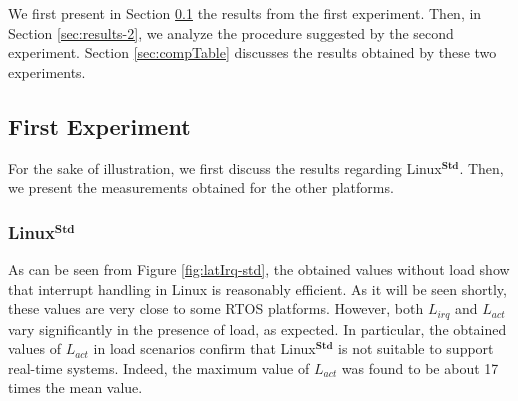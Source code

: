 \documentclass{acm_proc_article-sp}
\begin{document}
We first present in Section \ref{sec:results-1} the results from the first
experiment.  Then, in Section \ref{sec:results-2}, we analyze the procedure
suggested by the second experiment. Section \ref{sec:compTable} discusses the
results obtained by these two experiments.

\subsection{First Experiment}
\label{sec:results-1}

For the sake of illustration, we first discuss the results regarding
Linux$^\mathbf{Std}$.  Then, we present the measurements obtained for the other
platforms.

\subsubsection*{Linux$^\mathbf{Std}$}

As can be seen from Figure \ref{fig:latIrq-std}, the obtained values without load
show that interrupt handling in Linux is reasonably efficient. As it will be seen
shortly, these values are very close to some RTOS platforms.  However, both
$L_{irq}$ and $L_{act}$ vary significantly in the presence of load, as
expected.  In particular, the obtained values of $L_{act}$ in load scenarios
confirm that Linux$^\mathbf{Std}$ is not suitable to support real-time systems.
Indeed, the maximum value of $L_{act}$ was found to be about 17 times the mean value.

\begin{figure*}[t!]%
  \hspace{10pt}%
   
  \hspace{10pt}%
   
 \caption[Linux$^{\mathbf{Std}}$ latencies]{Linux$^{\mathbf{Std}}$ latencies.  The
   $eth_0$ interrupt handler is triggered by packets arriving at a $20 Hz$ frequency.}
 \label{fig:latIrq-std}%
\end{figure*}
\end{document}
